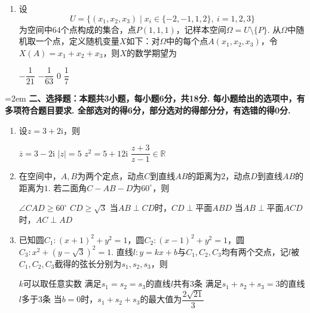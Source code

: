 \documentclass[12pt,a4paper]{article}
\begin{document}
\begin{enumerate}[leftmargin=*,label=\arabic*.,itemsep=0.8ex]
		\item 设
		\[
		U=\{(x_1,x_2,x_3)\mid x_i\in\{-2,-1,1,2\},\ i=1,2,3\}
		\]
		为空间中$64$个点构成的集合，点$P(1,1,1)$，记样本空间$\Omega=U\setminus\{P\}$. 从$\Omega$中随机取一个点，定义随机变量$X$如下：对$\Omega$中的每个点$A(x_1,x_2,x_3)$，令$X(A)=x_1+x_2+x_3$，则$X$的数学期望为
		\begin{choicesFour}
			\choice $-\dfrac1{21}$ \choice $-\dfrac1{63}$ \choice $0$ \choice $\dfrac17$
		\end{choicesFour}
		
	\end{enumerate}
	
	\vspace{0.3cm}
	
	\noindent\hangindent=2em {\bfseries 二、选择题：本题共3小题，每小题6分，共18分. 每小题给出的选项中，有多项符合题目要求. 全部选对的得6分，部分选对的得部分分，有选错的得0分.}
	
	\begin{enumerate}[leftmargin=*,label=\arabic*.,resume,itemsep=0.8ex]
		
		\item 设$z=3+2\mathrm{i}$，则
		\begin{choicesTwo}
			\choice $\overline{z}=3-2\mathrm{i}$
			\choice $|z|=5$
			\choice $z^2=5+12\mathrm{i}$
			\choice $\dfrac{z+3}{z-1}\in\mathbb{R}$
		\end{choicesTwo}
		
		\item 在空间中，$A,B$为两个定点，动点$C$到直线$AB$的距离为$2$，动点$D$到直线$AB$的距离为$1$. 若二面角$C-AB-D$为$60^\circ$，则
		\begin{choicesOne}
			\choice $\angle CAD\ge60^\circ$
			\choice $CD\ge\sqrt3$
			\choice 当$AB\perp CD$时，$CD\perp$平面$ABD$
			\choice 当$AB\perp$平面$ACD$时，$AC\perp AD$
		\end{choicesOne}
		
		\item 已知圆$C_1:(x+1)^2+y^2=1$，圆$C_2:(x-1)^2+y^2=1$，圆$C_3:x^2+(y-\sqrt3)^2=1$. 直线$l:y=kx+b$与$C_1,C_2,C_3$均有两个交点，记$l$被$C_1,C_2,C_3$截得的弦长分别为$s_1,s_2,s_3$，则
		\begin{choicesOne}
			\choice $k$可以取任意实数
			\choice 满足$s_1=s_2=s_3$的直线$l$共有$3$条
			\choice 满足$s_1+s_2+s_3=3$的直线$l$多于$3$条
			\choice 当$b=0$时，$s_1+s_2+s_3$的最大值为$\dfrac{2\sqrt{21}}{3}$
		\end{choicesOne}
		
	\end{enumerate}
	
\end{document}
